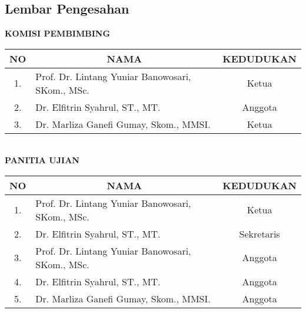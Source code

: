 \documentclass[a4paper]{article}
\newcommand{\fontChapterTitle}{14pt}
\newcommand{\buLintang}{Prof. Dr. Lintang Yuniar Banowosari, SKom., MSc.}
\newcommand{\buElfitrin}{Dr. Elfitrin Syahrul, ST., MT.}
\newcommand{\buMarliza}{Dr. Marliza Ganefi Gumay, Skom., MMSI.}
\begin{document}
    \begin{center}
        
        {\fontsize{\fontChapterTitle}{0}\selectfont
            \section*{
                Lembar Pengesahan \\[2em]
            } 
        }
        
        \newcommand{\spaceTitle}{0.5em}
        \textbf{KOMISI PEMBIMBING} \\[\spaceTitle]    
        \begin{tabular}{|c|p{10cm}|c|}
            \hline 
                \multicolumn{1}{|c|}{\textbf{NO}} & 
                \multicolumn{1}{c|}{\textbf{NAMA}} & 
                \multicolumn{1}{c|}{\textbf{KEDUDUKAN}} \\
            \hline 
                1. & \buLintang & Ketua \\
            \hline 
                2. & \buElfitrin & Anggota \\
            \hline 
                3. & \buMarliza  & Ketua \\
            \hline
        \end{tabular} \\[3em]

        \textbf{PANITIA UJIAN} \\[\spaceTitle]
        \begin{tabular}{|c|p{10cm}|c|}
            \hline 
                \multicolumn{1}{|c|}{\textbf{NO}} & 
                \multicolumn{1}{c|}{\textbf{NAMA}} & 
                \multicolumn{1}{c|}{\textbf{KEDUDUKAN}} \\
            \hline 
                1. & \buLintang & Ketua \\
            \hline 
                2. & \buElfitrin & Sekretaris \\
            \hline 
                3. & \buLintang  & Anggota \\
            \hline 
                4. & \buElfitrin  & Anggota \\
            \hline 
                5. & \buMarliza  & Anggota \\
            \hline
        \end{tabular} \\[4em]

         \\[1em]
    
    \end{center} 
\end{document}
